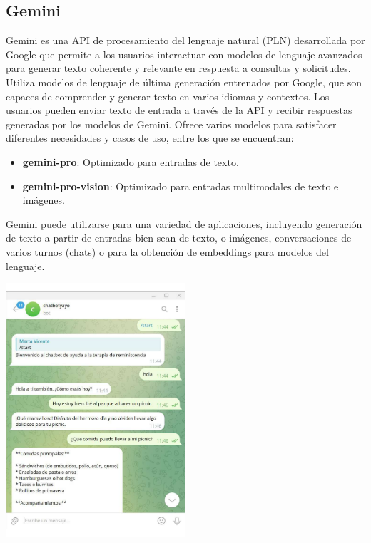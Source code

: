 \subsection{Gemini}


Gemini es una API de procesamiento del lenguaje natural (PLN) desarrollada por Google que permite a los usuarios interactuar con modelos de lenguaje avanzados para generar texto coherente y relevante en respuesta a consultas y solicitudes. Utiliza modelos de lenguaje de última generación entrenados por Google, que son capaces de comprender y generar texto en varios idiomas y contextos. Los usuarios pueden enviar texto de entrada a través de la API y recibir respuestas generadas por los modelos de Gemini. Ofrece varios modelos para satisfacer diferentes necesidades y casos de uso, entre los que se encuentran:
\begin{itemize}[label=$\bullet$, leftmargin=*]
	\item \textbf{gemini-pro}: Optimizado para entradas de texto.
	\item \textbf{gemini-pro-vision}: Optimizado para entradas multimodales de texto e imágenes.
\end{itemize}

Gemini puede utilizarse para una variedad de aplicaciones, incluyendo generación de texto a partir de entradas bien sean de texto, o imágenes, conversaciones de varios turnos (chats) o para la obtención de embeddings para modelos del lenguaje. 



\includegraphics[width=0.5\textwidth]{Imagenes/telegram1}

